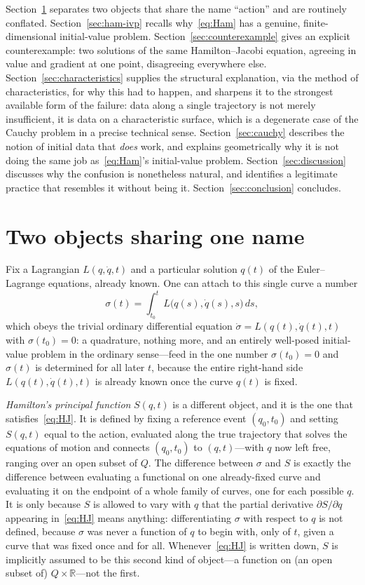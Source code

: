 \documentclass[11pt]{article}
\newcommand{\R}{\mathbb{R}}
\begin{document}
Section~\ref{sec:two-objects} separates two objects that share the name ``action'' and are routinely conflated. Section~\ref{sec:ham-ivp} recalls why~\eqref{eq:Ham} has a genuine, finite-dimensional initial-value problem. Section~\ref{sec:counterexample} gives an explicit counterexample: two solutions of the same Hamilton--Jacobi equation, agreeing in value and gradient at one point, disagreeing everywhere else. Section~\ref{sec:characteristics} supplies the structural explanation, via the method of characteristics, for why this had to happen, and sharpens it to the strongest available form of the failure: data along a single trajectory is not merely insufficient, it is data on a characteristic surface, which is a degenerate case of the Cauchy problem in a precise technical sense. Section~\ref{sec:cauchy} describes the notion of initial data that \emph{does} work, and explains geometrically why it is not doing the same job as~\eqref{eq:Ham}'s initial-value problem. Section~\ref{sec:discussion} discusses why the confusion is nonetheless natural, and identifies a legitimate practice that resembles it without being it. Section~\ref{sec:conclusion} concludes.

\section{Two objects sharing one name}
\label{sec:two-objects}

Fix a Lagrangian $L(q,\dot q,t)$ and a particular solution $q(t)$ of the Euler--Lagrange equations, already known. One can attach to this single curve a number
\begin{equation}
\sigma(t) = \int_{t_0}^t L\big(q(s),\dot q(s),s\big)\, ds ,
\end{equation}
which obeys the trivial ordinary differential equation $\dot\sigma = L(q(t),\dot q(t),t)$ with $\sigma(t_0)=0$: a quadrature, nothing more, and an entirely well-posed initial-value problem in the ordinary sense---feed in the one number $\sigma(t_0)=0$ and $\sigma(t)$ is determined for all later $t$, because the entire right-hand side $L(q(t),\dot q(t),t)$ is already known once the curve $q(t)$ is fixed.

\emph{Hamilton's principal function} $S(q,t)$ is a different object, and it is the one that satisfies~\eqref{eq:HJ}. It is defined by fixing a reference event $(q_0,t_0)$ and setting $S(q,t)$ equal to the action, evaluated along the true trajectory that solves the equations of motion and connects $(q_0,t_0)$ to $(q,t)$---with $q$ now left free, ranging over an open subset of $Q$. The difference between $\sigma$ and $S$ is exactly the difference between evaluating a functional on one already-fixed curve and evaluating it on the endpoint of a whole family of curves, one for each possible $q$. It is only because $S$ is allowed to vary with $q$ that the partial derivative $\partial S/\partial q$ appearing in~\eqref{eq:HJ} means anything: differentiating $\sigma$ with respect to $q$ is not defined, because $\sigma$ was never a function of $q$ to begin with, only of $t$, given a curve that was fixed once and for all. Whenever~\eqref{eq:HJ} is written down, $S$ is implicitly assumed to be this second kind of object---a function on (an open subset of) $Q\times\R$---not the first.
\end{document}
